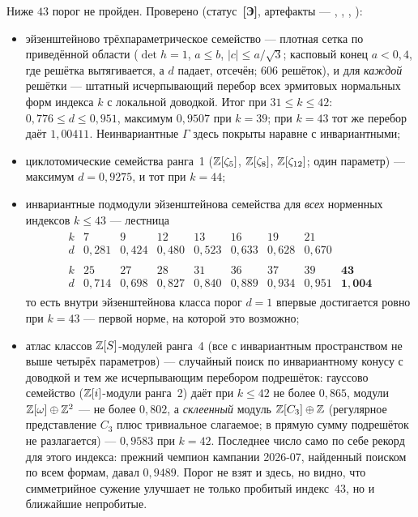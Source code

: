 \begin{enumerate}[leftmargin=1.5em]
Ниже $43$ порог не пройден. Проверено (статус~\textbf{[Э]}, артефакты ---
,
,
,
):
\begin{itemize}[leftmargin=1.3em,topsep=2pt]
\item эйзенштейново трёхпараметрическое семейство --- плотная сетка по
приведённой области ($\det h=1$, $a\le b$, $|c|\le a/\sqrt3$; касповый конец
$a<0{,}4$, где решётка вытягивается, а $d$ падает, отсечён; $606$ решёток), и
для \emph{каждой} решётки --- штатный исчерпывающий перебор всех эрмитовых
нормальных форм индекса $k$ с локальной доводкой. Итог при $31\le k\le42$:
$0{,}776\le d\le0{,}951$, максимум $0{,}9507$ при $k=39$; при $k=43$ тот же
перебор даёт $1{,}00411$. Неинвариантные $\Gamma$ здесь покрыты наравне с
инвариантными;
\item циклотомические семейства ранга~1 ($\mathbb{Z}[\zeta_5]$, $\mathbb{Z}[\zeta_8]$,
$\mathbb{Z}[\zeta_{12}]$; один параметр) --- максимум $d=0{,}9275$, и тот при $k=44$;
\item инвариантные подмодули эйзенштейнова семейства для \emph{всех}
норменных индексов $k\le43$ --- лестница
\[
\begin{gathered}
\begin{array}{c|ccccccc}
k & 7&9&12&13&16&19&21\\\hline
d & 0{,}281&0{,}424&0{,}480&0{,}523&0{,}633&0{,}628&0{,}670
\end{array}\\[4pt]
\begin{array}{c|cccccccc}
k & 25&27&28&31&36&37&39&\mathbf{43}\\\hline
d & 0{,}714&0{,}698&0{,}827&0{,}840&0{,}889&0{,}934&0{,}951&\mathbf{1{,}004}
\end{array}
\end{gathered}
\]
то есть внутри эйзенштейнова класса порог $d=1$ впервые достигается ровно при
$k=43$ --- первой норме, на которой это возможно;
\item атлас классов $\mathbb{Z}[S]$-модулей ранга~4 (все с инвариантным
пространством не выше четырёх параметров) --- случайный поиск по инвариантному
конусу с доводкой и тем же исчерпывающим перебором подрешёток: гауссово
семейство ($\mathbb{Z}[i]$-модули ранга~2) даёт при $k\le42$ не более $0{,}865$,
модули $\mathbb{Z}[\omega]\oplus\mathbb{Z}^2$ --- не более $0{,}802$, а \emph{склеенный}
модуль $\mathbb{Z}[C_3]\oplus\mathbb{Z}$ (регулярное представление $C_3$ плюс тривиальное
слагаемое; в прямую сумму подрешёток не разлагается) --- $0{,}9583$ при
$k=42$. Последнее число само по себе рекорд для этого индекса: прежний
чемпион кампании 2026-07, найденный поиском по всем формам, давал $0{,}9489$.
Порог не взят и здесь, но видно, что симметрийное сужение улучшает не только
пробитый индекс~$43$, но и ближайшие непробитые.
\end{itemize}

\end{enumerate}
